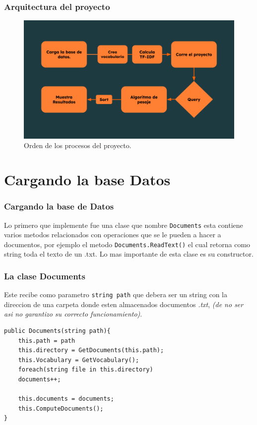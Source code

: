 \documentclass[11pt]{beamer}
\begin{document}
\begin{frame}[fragile]
    \frametitle{Arquitectura del proyecto}
    \begin{figure}[h]
        \includegraphics[width = 1\linewidth]{Project.png}
        \caption{Orden de los procesos del proyecto.}
    \end{figure}
\end{frame}

\section*{Cargando la base Datos}
\begin{frame}[fragile]
    \frametitle{Cargando la base de Datos}
    Lo primero que implemente fue una clase que nombre \texttt{Documents} esta contiene varios metodos relacionados con operaciones que se le pueden a hacer a documentos, por ejemplo el metodo \texttt{Documents.ReadText()} el cual retorna como string toda el texto de un .txt. Lo mas importante de esta clase es su constructor.
    \begin{small}
    \end{small}
\end{frame}

\begin{frame}[fragile]
    \frametitle{La clase Documents}
    Este recibe como parametro \texttt{string path} que debera ser un string con la direccion de una carpeta donde esten almacenados documentos \emph{.txt}, \textit{(de no ser asi no garantizo su correcto funcionamiento)}. 
    \begin{Verbatim}[frame=single]
public Documents(string path){
    this.path = path
    this.directory = GetDocuments(this.path);
    this.Vocabulary = GetVocabulary();
    foreach(string file in this.directory)
    documents++;
    
    this.documents = documents;
    this.ComputeDocuments();
}
    \end{Verbatim}
    
\end{frame}
\end{document}
